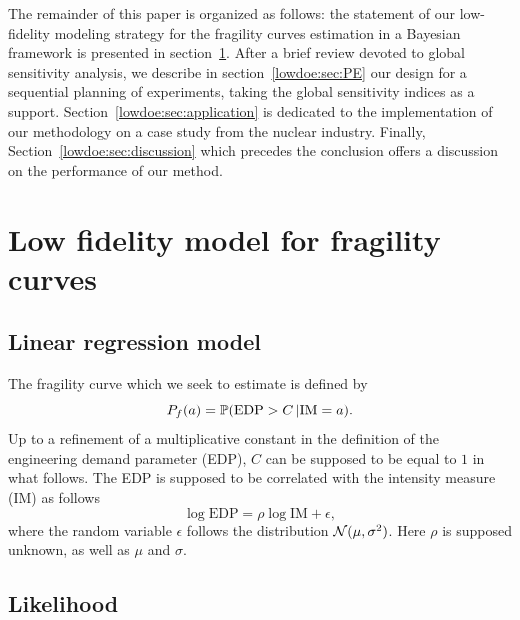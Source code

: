 The remainder of this paper is organized as follows:
the statement of our low-fidelity modeling strategy for the fragility curves estimation in a Bayesian framework is presented in section~\ref{lowdoe:sec:modeling}.
After a brief review devoted to global sensitivity analysis, we describe in section~\ref{lowdoe:sec:PE} our design for a sequential planning of experiments, taking the global sensitivity indices as a support.
Section~\ref{lowdoe:sec:application} is dedicated to the implementation of our methodology on a case study from the nuclear industry. Finally, Section~\ref{lowdoe:sec:discussion} which precedes the conclusion offers a discussion on the performance of our method.






\section{Low fidelity model for fragility curves}\label{lowdoe:sec:modeling}
    \subsection{Linear regression model}
    
    The fragility curve which we seek to estimate is defined by
\begin{equation}
    P_f(a) = \mathbb{P}(\mathrm{EDP}>C\,|\mathrm{IM}=a).
\end{equation}
Up to a refinement of a multiplicative constant in the definition of the engineering demand parameter (EDP), $C$ can be supposed to be equal to $1$ in what follows.
The EDP is supposed to be correlated with the intensity measure (IM) as follows
\begin{equation}
    \log \mathrm{EDP} = \rho\log \mathrm{IM} + \epsilon ,
\end{equation}
where the random variable $\epsilon$ follows 
the distribution $\mathcal{N}(\mu,\sigma^2)$.
Here $\rho$ is supposed unknown, as well as $\mu$ and $\sigma$. 




    
    \subsection{Likelihood}\label{lowdoe:sec:likelihood}

